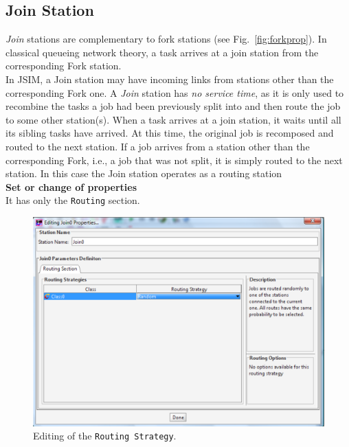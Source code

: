 \subsection{Join Station}
 \emph{Join} stations are complementary to fork
stations (see Fig.~\ref{fig:forkprop}). In classical queueing
network theory, a task arrives at a join station from the
corresponding Fork station.\\

In JSIM, a Join station may have incoming links from stations
other than the corresponding Fork one. A \emph{Join} station has
\emph{no service time}, as it is only used to recombine the tasks
a job had been previously split into and then route the job to
some other station(s). When a task arrives at a join station, it
waits until all its sibling tasks have arrived. At this time, the
original job is recomposed and routed to the next station. If a
job arrives from a station other than the corresponding Fork,
i.e., a job that was not split, it is simply routed to the next
station. In this
case the Join station operates as a routing station\\

\noindent \textbf{ Set or change of properties}\\ It has only the
\texttt{Routing} section.\\
\begin{figure}[htb]
    \begin{center}
        \includegraphics[scale=.5]{img/jsimg/8.24.eps}
    \end{center}
    \caption{Editing of the \texttt{Routing Strategy}.}
    \label{fig:edjprop}
\end{figure}

